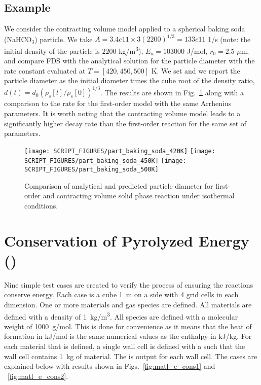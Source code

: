 \documentclass[11pt]{book}
\begin{document}
\subsection*{Example}

We consider the contracting volume model applied to a spherical baking soda (NaHCO$_3$) particle.  We take $A = 3.4e11 \times 3(2200)^{1/3} = 133e11$ 1/s (note: the initial density of the particle is $2200$ \si{kg/m^3}), $E_a = 103000$ J/mol, $r_0 = 2.5$ $\mu$m, and compare FDS with the analytical solution for the particle diameter with the rate constant evaluated at $T=[420, 450, 500]$ K.  We set  and we report the particle diameter as the initial diameter times the cube root of the density ratio, $d(t) = d_0 (\rho_{s}[t]/\rho_s[0])^{1/3}$.  The results are shown in Fig.~\ref{fig:part_baking_soda} along with a comparison to the rate for the first-order model with the same Arrhenius parameters.  It is worth noting that the contracting volume model leads to a significantly higher decay rate than the first-order reaction for the same set of parameters.

\begin{figure}[!h]
\centering
\texttt{[image: SCRIPT\_FIGURES/part\_baking\_soda\_420K]}
\texttt{[image: SCRIPT\_FIGURES/part\_baking\_soda\_450K]}
\texttt{[image: SCRIPT\_FIGURES/part\_baking\_soda\_500K]}
\caption[The  test cases]{Comparison of analytical and predicted particle diameter for first-order and contracting volume solid phase reaction under isothermal conditions.}
\label{fig:part_baking_soda}
\end{figure}

\section{Conservation of Pyrolyzed Energy (\texorpdfstring{}{matl\_e\_cons})}
\label{matl_e_cons}

Nine simple test cases are created to verify the process of ensuring the  reactions conserve energy. Each case is a cube 1~m on a side with 4 grid cells in each dimension. One or more materials and gas species are defined. All materials are defined with a density of 1~\si{kg/m^3}. All species are defined with a molecular weight of 1000~\si{g/mol}. This is done for convenience as it means that the heat of formation in \si{kJ/mol} is the same numerical values as the enthalpy in \si{kJ/kg}. For each material that is defined, a single wall cell  is defined with a  such that the wall cell contains 1~kg of material. The  is output for each wall cell. The cases are explained below with results shown in Figs.~\ref{fig:matl_e_cons1} and ~\ref{fig:matl_e_cons2}.
\end{document}
